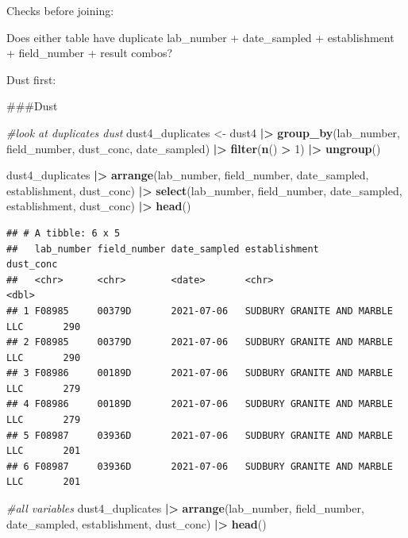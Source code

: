 \documentclass[
]{article}
\newenvironment{Shaded}{\begin{snugshade}}{\end{snugshade}}
\newcommand{\CommentTok}[1]{\textcolor[rgb]{0.56,0.35,0.01}{\textit{#1}}}
\newcommand{\DecValTok}[1]{\textcolor[rgb]{0.00,0.00,0.81}{#1}}
\newcommand{\FunctionTok}[1]{\textcolor[rgb]{0.13,0.29,0.53}{\textbf{#1}}}
\newcommand{\NormalTok}[1]{#1}
\newcommand{\OtherTok}[1]{\textcolor[rgb]{0.56,0.35,0.01}{#1}}
\newcommand{\SpecialCharTok}[1]{\textcolor[rgb]{0.81,0.36,0.00}{\textbf{#1}}}
\begin{document}
Checks before joining:

Does either table have duplicate lab\_number + date\_sampled +
establishment + field\_number + result combos?

Dust first:

\#\#\#Dust

\begin{Shaded}
\begin{Highlighting}[]
\CommentTok{\#look at duplicates dust}
\NormalTok{dust4\_duplicates }\OtherTok{\textless{}{-}}\NormalTok{ dust4 }\SpecialCharTok{|\textgreater{}}
  \FunctionTok{group\_by}\NormalTok{(lab\_number, field\_number, dust\_conc, date\_sampled) }\SpecialCharTok{|\textgreater{}}
  \FunctionTok{filter}\NormalTok{(}\FunctionTok{n}\NormalTok{() }\SpecialCharTok{\textgreater{}} \DecValTok{1}\NormalTok{) }\SpecialCharTok{|\textgreater{}}
  \FunctionTok{ungroup}\NormalTok{() }

\NormalTok{dust4\_duplicates }\SpecialCharTok{|\textgreater{}}  
  \FunctionTok{arrange}\NormalTok{(lab\_number, field\_number, date\_sampled, establishment, dust\_conc) }\SpecialCharTok{|\textgreater{}} 
  \FunctionTok{select}\NormalTok{(lab\_number, field\_number, date\_sampled, establishment, dust\_conc) }\SpecialCharTok{|\textgreater{}} 
  \FunctionTok{head}\NormalTok{()}
\end{Highlighting}
\end{Shaded}

\begin{verbatim}
## # A tibble: 6 x 5
##   lab_number field_number date_sampled establishment                  dust_conc
##   <chr>      <chr>        <date>       <chr>                              <dbl>
## 1 F08985     00379D       2021-07-06   SUDBURY GRANITE AND MARBLE LLC       290
## 2 F08985     00379D       2021-07-06   SUDBURY GRANITE AND MARBLE LLC       290
## 3 F08986     00189D       2021-07-06   SUDBURY GRANITE AND MARBLE LLC       279
## 4 F08986     00189D       2021-07-06   SUDBURY GRANITE AND MARBLE LLC       279
## 5 F08987     03936D       2021-07-06   SUDBURY GRANITE AND MARBLE LLC       201
## 6 F08987     03936D       2021-07-06   SUDBURY GRANITE AND MARBLE LLC       201
\end{verbatim}

\begin{Shaded}
\begin{Highlighting}[]
\CommentTok{\#all variables }
\NormalTok{dust4\_duplicates }\SpecialCharTok{|\textgreater{}} 
  \FunctionTok{arrange}\NormalTok{(lab\_number, field\_number, date\_sampled, establishment, dust\_conc) }\SpecialCharTok{|\textgreater{}} 
  \FunctionTok{head}\NormalTok{()}
\end{Highlighting}
\end{Shaded}
\end{document}
